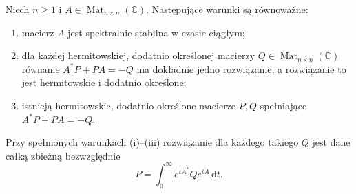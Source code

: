 \begin{twierdzenie}
\label{thm:lin22-lyapunov}
Niech \(n\ge1\) i
\(A\in\operatorname{Mat}_{n\times n}(\mathbb C)\).
Następujące warunki są równoważne:
\begin{enumerate}[label=\textup{(\roman*)}]
 \item macierz \(A\) jest
 spektralnie stabilna w czasie ciągłym;
 \item dla każdej hermitowskiej,
 dodatnio określonej macierzy
 \(Q\in\operatorname{Mat}_{n\times n}(\mathbb C)\)
 równanie \(A^*P+PA=-Q\)
 ma dokładnie jedno rozwiązanie,
 a rozwiązanie to jest hermitowskie
 i dodatnio określone;
 \item istnieją hermitowskie,
 dodatnio określone macierze \(P,Q\)
 spełniające
 \(A^*P+PA=-Q\).
\end{enumerate}
Przy spełnionych warunkach
\textup{(i)--(iii)} rozwiązanie
dla każdego takiego \(Q\)
jest dane całką zbieżną bezwzględnie
\[
 P=\int_0^\infty e^{tA^*}Qe^{tA}\,\mathrm dt.
\]
\end{twierdzenie}

